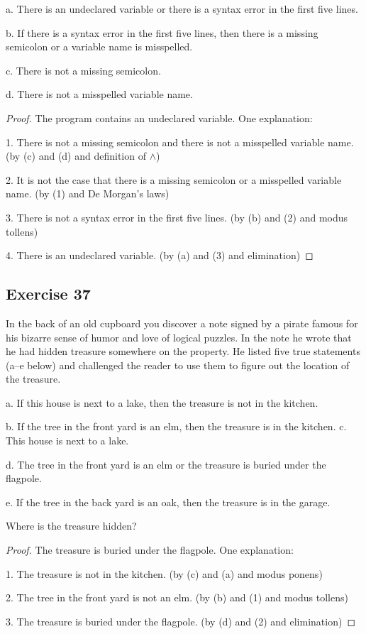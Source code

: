 \documentclass[14pt]{extarticle}
\begin{document}
a. There is an undeclared variable or there is a syntax error in the first five
lines.

b. If there is a syntax error in the first five lines, then there is a missing
semicolon or a variable name is misspelled.

c. There is not a missing semicolon.

d. There is not a misspelled variable name.

\begin{proof}
The program contains an undeclared variable. One explanation:

1. There is not a missing semicolon and there is not a
misspelled variable name. (by (c) and (d) and definition of $\wedge$)

2. It is not the case that there is a missing semicolon or a misspelled variable
name. (by (1) and De Morgan’s laws)

3. There is not a syntax error in the first five lines. (by (b) and (2) and
modus tollens)

4. There is an undeclared variable. (by (a) and (3) and elimination)
\end{proof}

\subsection{Exercise 37}
In the back of an old cupboard you discover a note signed by a pirate famous for
his bizarre sense of humor and love of logical puzzles. In the note he wrote
that he had hidden treasure somewhere on the property. He listed five true
statements (a–e
below) and challenged the reader to use them to figure out the location of the
treasure.

a. If this house is next to a lake, then the treasure is not in the kitchen.

b. If the tree in the front yard is an elm, then the treasure is in the kitchen.
c. This house is next to a lake. 

d. The tree in the front yard is an elm or the treasure is buried under the
flagpole.

e. If the tree in the back yard is an oak, then the treasure is in the garage.

Where is the treasure hidden?

\begin{proof}
The treasure is buried under the flagpole. One explanation:

1. The treasure is not in the kitchen. (by (c) and (a) and
modus ponens)

2. The tree in the front yard is not an elm. (by (b) and
(1) and modus tollens)

3. The treasure is buried under the flagpole. (by (d) and (2) and elimination)
\end{proof}
\end{document}
